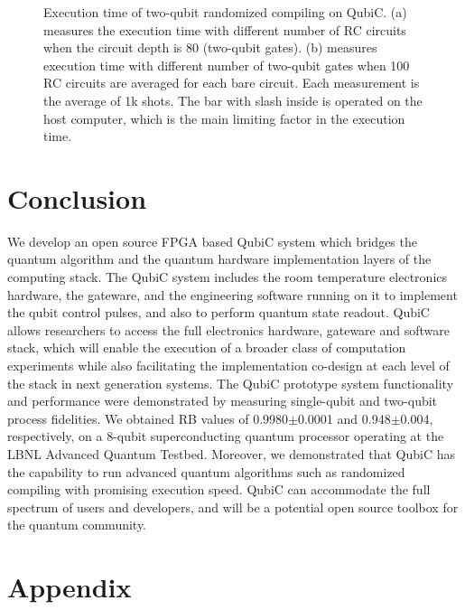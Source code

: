 \documentclass{ieeetran}
\begin{document}
\begin{figure}[t!]
\centering
{}
\vfil
{}
\caption{Execution time of two-qubit randomized compiling on QubiC. (a) measures the execution time with different number of RC circuits when the circuit depth is 80 (two-qubit gates). (b) measures execution time with different number of two-qubit gates when 100 RC circuits are averaged for each bare circuit. Each measurement is the average of 1k shots. The bar with slash inside is operated on the host computer, which is the main limiting factor in the execution time.}
\label{fig:rcspeed}
\end{figure}

\section{Conclusion}
We develop an open source FPGA based QubiC system which bridges the quantum algorithm and the quantum hardware implementation layers of the computing stack.
The QubiC system includes the room temperature electronics hardware, the gateware, and the engineering software running on it to implement the qubit control pulses, and also to perform quantum state readout. 
QubiC allows researchers to access the full electronics hardware, gateware and software stack, which will enable the execution of a broader class of computation experiments while also facilitating the implementation co-design at each level of the stack in next generation systems. 
The QubiC prototype system functionality and performance were demonstrated by measuring single-qubit and two-qubit process fidelities. 
We obtained RB values of 0.9980$\pm$0.0001 and 0.948$\pm$0.004, respectively, on a 8-qubit superconducting quantum processor operating at the LBNL Advanced Quantum Testbed.
Moreover, we demonstrated that QubiC has the capability to run advanced quantum algorithms such as randomized compiling with promising execution speed. 
QubiC can accommodate the full spectrum of users and developers, and will be a potential open source toolbox for the quantum community.

\section*{Appendix}
\label{appendix}
\end{document}
